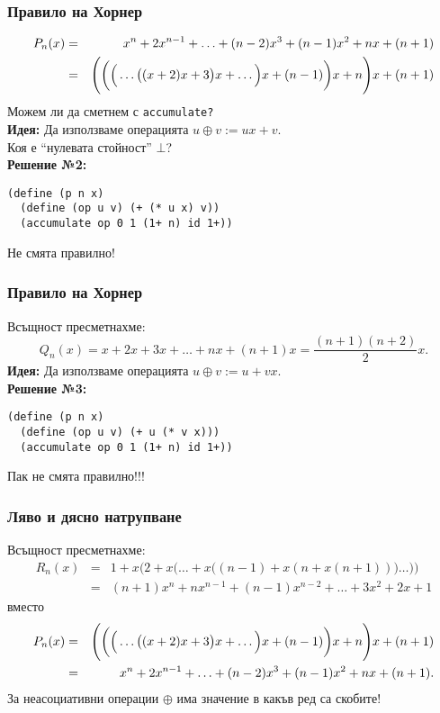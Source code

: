 \documentclass{beamer}
\begin{document}
\newcommand{\pnxh}{\Bigg(\bigg(\Big(\ldots\big((x + 2)x + 3\big)x + \ldots\Big)x + (n-1)\bigg)x + n\Bigg)x + (n+1)}

\begin{frame}[fragile]
  \frametitle{Правило на Хорнер}

  \begin{eqnarray*}
    P_n(x) &=& \pnx\\
           &=& \pnxh
  \end{eqnarray*}
  \pause
  \alert{Можем ли да сметнем с \tt{accumulate}?}\\
  \pause
  \textbf{Идея:} Да използваме операцията $u \oplus v := ux + v$.\\
  \pause
  \alert{Коя е ``нулевата стойност''  $\bot$?}\\[0.5em]
  \pause
  \textbf{Решение №2:}
\begin{lstlisting}
(define (p n x)
  (define (op u v) (+ (* u x) v))
  (accumulate op 0 1 (1+ n) id 1+))
\end{lstlisting}
  \pause
  \alert{Не смята правилно!}
\end{frame}

\begin{frame}[fragile]
  \frametitle{Правило на Хорнер}

Всъщност пресметнахме:
\begin{equation*}
  Q_n(x) = x + 2x + 3x + \ldots + nx + (n+1)x= \frac{(n+1)(n+2)}2x.
\end{equation*}
  \pause
  \textbf{Идея:} Да използваме операцията $u \oplus v := u + vx$.\\[1em]
  \pause
  \textbf{Решение №3:}
\begin{lstlisting}
(define (p n x)
  (define (op u v) (+ u (* v x)))
  (accumulate op 0 1 (1+ n) id 1+))
\end{lstlisting}
  \pause
  \alert{Пак не смята правилно!!!}
\end{frame}

\begin{frame}
  \frametitle{Ляво и дясно натрупване}

  Всъщност пресметнахме:
  \begin{eqnarray*}
    R_n(x) &=& 1+x\bigg(2+x\Big(\ldots+x\Big((n-1)+x(n+x(n+1))\Big)\ldots\Big)\bigg)\\
          &=&  (n+1)x^n + nx^{n-1} + (n-1)x^{n-2} + \ldots + 3x^2 + 2x + 1
  \end{eqnarray*}
  вместо
  \begin{eqnarray*}
    P_n(x) &=& \pnxh\\
    &=& \pnx.
  \end{eqnarray*}
  \pause
  \alert{За неасоциативни операции $\oplus$ има значение в какъв ред са скобите!}
\end{frame}
\end{document}
